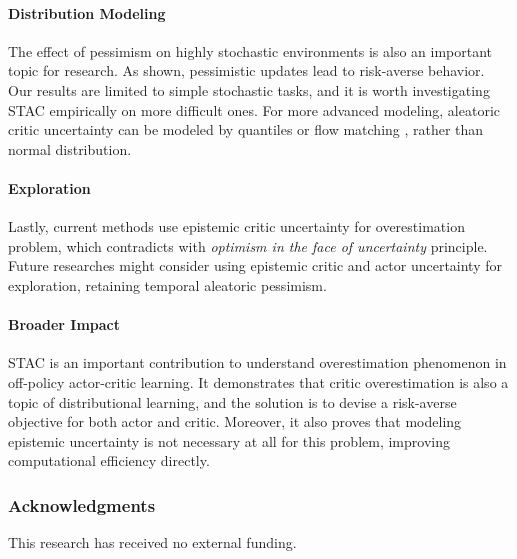 \documentclass{article}
\begin{document}
\paragraph{Distribution Modeling} The effect of pessimism on highly stochastic environments is also an important topic for research. As shown, pessimistic updates lead to risk-averse behavior. Our results are limited to simple stochastic tasks, and it is worth investigating STAC empirically on more difficult ones. For more advanced modeling, aleatoric critic uncertainty can be modeled by quantiles \citep{dabney2018distributional, ma2025dsac} or flow matching \citep{chen2025unleashing, dong2025value}, rather than normal distribution. 

\paragraph{Exploration} Lastly, current methods use epistemic critic uncertainty for overestimation problem, which contradicts with \textit{optimism in the face of uncertainty} principle. Future researches might consider using epistemic critic and actor uncertainty for exploration, retaining temporal aleatoric pessimism. 

\paragraph{Broader Impact} STAC is an important contribution to understand overestimation phenomenon in off-policy actor-critic learning. It demonstrates that critic overestimation is also a topic of distributional learning, and the solution is to devise a risk-averse objective for both actor and critic. Moreover, it also proves that modeling epistemic uncertainty is not necessary at all for this problem, improving computational efficiency directly. 

\subsubsection*{Acknowledgments}
This research has received no external funding. 



\end{document}
